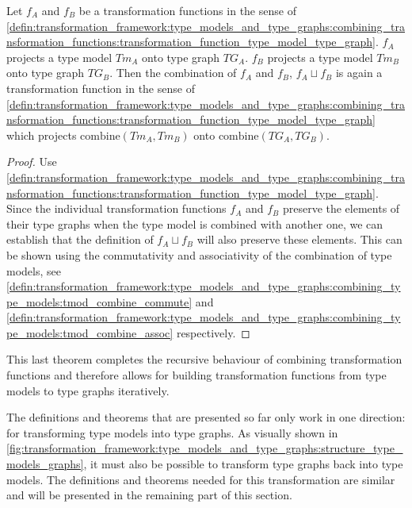 \begin{thm}
\label{defin:transformation_framework:type_models_and_type_graphs:combining_transformation_functions:tg_combine_mapping_function_correct}
Let $f_A$ and $f_B$ be a transformation functions in the sense of \cref{defin:transformation_framework:type_models_and_type_graphs:combining_transformation_functions:transformation_function_type_model_type_graph}. $f_A$ projects a type model $Tm_A$ onto type graph $TG_A$. $f_B$ projects a type model $Tm_B$ onto type graph $TG_B$. Then the combination of $f_A$ and $f_B$, $f_{A} \sqcup f_{B}$ is again a transformation function in the sense of \cref{defin:transformation_framework:type_models_and_type_graphs:combining_transformation_functions:transformation_function_type_model_type_graph} which projects $\mathrm{combine}(Tm_A, Tm_B)$ onto $\mathrm{combine}(TG_A, TG_B)$.
\end{thm}

\begin{proof}
Use \cref{defin:transformation_framework:type_models_and_type_graphs:combining_transformation_functions:transformation_function_type_model_type_graph}. Since the individual transformation functions $f_A$ and $f_B$ preserve the elements of their type graphs when the type model is combined with another one, we can establish that the definition of $f_{A} \sqcup f_{B}$ will also preserve these elements. This can be shown using the commutativity and associativity of the combination of type models, see \cref{defin:transformation_framework:type_models_and_type_graphs:combining_type_models:tmod_combine_commute} and \cref{defin:transformation_framework:type_models_and_type_graphs:combining_type_models:tmod_combine_assoc} respectively.
\end{proof}

This last theorem completes the recursive behaviour of combining transformation functions and therefore allows for building transformation functions from type models to type graphs iteratively.

The definitions and theorems that are presented so far only work in one direction: for transforming type models into type graphs. As visually shown in \cref{fig:transformation_framework:type_models_and_type_graphs:structure_type_models_graphs}, it must also be possible to transform type graphs back into type models. The definitions and theorems needed for this transformation are similar and will be presented in the remaining part of this section.

